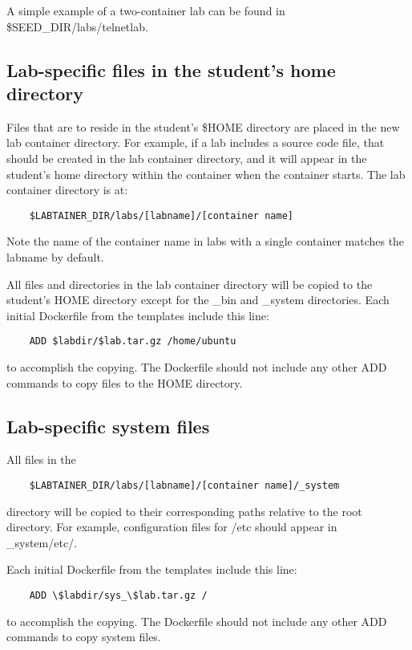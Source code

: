 \documentclass{article}
\begin{document}
A simple example of a two-container lab can be found in \$SEED\_DIR/labs/telnetlab. 


\subsection {Lab-specific files in the student's home directory}
Files that are to reside in the student's \$HOME directory are placed in the 
new lab container directory.  For example, if a lab includes a source code file, that
should be created in the lab container directory, and it will appear in the student's
home directory within the container when the container starts.  The lab container
directory is at:  

\begin{verbatim}
    $LABTAINER_DIR/labs/[labname]/[container name]
\end{verbatim}
Note the name of the container name in labs with a single container matches the labname by default.

All files and directories in the lab container directory will be copied to the student's HOME
directory except for the \_bin and \_system directories.
Each initial Dockerfile from the templates include this line:
\begin{verbatim}
    ADD $labdir/$lab.tar.gz /home/ubuntu
\end{verbatim}
to accomplish the copying. The Dockerfile should not include any other ADD commands
to copy files to the HOME directory.

\subsection{Lab-specific system files}
All files in the
\begin{verbatim}
    $LABTAINER_DIR/labs/[labname]/[container name]/_system
\end{verbatim}
directory will be copied to their corresponding paths relative to the root directory.
For example, configuration files for /etc should appear in \_system/etc/.

Each initial Dockerfile from the templates include this line:
\begin{verbatim}
    ADD \$labdir/sys_\$lab.tar.gz /
\end{verbatim}
to accomplish the copying. The Dockerfile should not include any other ADD commands
to copy system files.
\end{document}
